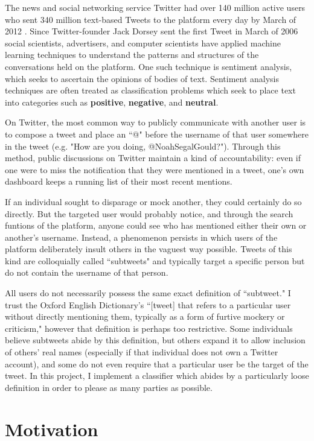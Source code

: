 \documentclass[11pt, twoside, reqno]{book}
\begin{document}
The news and social networking service Twitter had over 140 million active users who sent 340 million text-based Tweets to the platform every day by March of 2012 \cite{twitter_stats}. Since Twitter-founder Jack Dorsey sent the first Tweet in March of 2006 \cite{first_tweet} social scientists, advertisers, and computer scientists have applied machine learning techniques to understand the patterns and structures of the conversations held on the platform. One such technique is sentiment analysis, which seeks to ascertain the opinions of bodies of text. Sentiment analysis techniques are often treated as classification problems which seek to place text into categories such as \textbf{positive}, \textbf{negative}, and \textbf{neutral}.

On Twitter, the most common way to publicly communicate with another user is to compose a tweet and place an ``@" before the username of that user somewhere in the tweet (e.g. "How are you doing, @NoahSegalGould?"). Through this method, public discussions on Twitter maintain a kind of accountability: even if one were to miss the notification that they were mentioned in a tweet, one's own dashboard keeps a running list of their most recent mentions. 

If an individual sought to disparage or mock another, they could certainly do so directly. But the targeted user would probably notice, and through the search funtions of the platform, anyone could see who has mentioned either their own or another's username. Instead, a phenomenon persists in which users of the platform deliberately insult others in the vaguest way possible. Tweets of this kind are colloquially called ``subtweets" and typically target a specific person but do not contain the username of that person.

All users do not necessarily possess the same exact definition of ``subtweet." I trust the Oxford English Dictionary's ``[tweet] that refers to a particular user without directly mentioning them, typically as a form of furtive mockery or criticism," however that definition is perhaps too restrictive. Some individuals believe subtweets abide by this definition, but others expand it to allow inclusion of others' real names (especially if that individual does not own a Twitter account), and some do not even require that a particular user be the target of the tweet. In this project, I implement a classifier which abides by a particularly loose definition in order to please as many parties as possible. 

\section{Motivation}
\label{motivation_and_prior_work}
\end{document}
